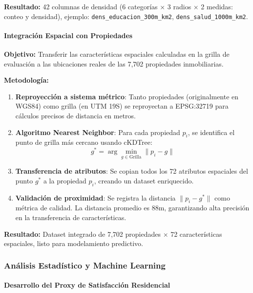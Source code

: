 \textbf{Resultado:} 42 columnas de densidad (6 categorías × 3 radios × 2 medidas: conteo y densidad), ejemplo: \texttt{dens\_educacion\_300m\_km2}, \texttt{dens\_salud\_1000m\_km2}.

\paragraph{Integración Espacial con Propiedades}

\textbf{Objetivo:} Transferir las características espaciales calculadas en la grilla de evaluación a las ubicaciones reales de las 7,702 propiedades inmobiliarias.

\textbf{Metodología:}
\begin{enumerate}
    \item \textbf{Reproyección a sistema métrico}: Tanto propiedades (originalmente en WGS84) como grilla (en UTM 19S) se reproyectan a EPSG:32719 para cálculos precisos de distancia en metros.
    
    \item \textbf{Algoritmo Nearest Neighbor}: Para cada propiedad $p_i$, se identifica el punto de grilla más cercano usando cKDTree:
    \begin{equation}
    g^* = \arg\min_{g \in \text{Grilla}} \|p_i - g\|
    \end{equation}
    
    \item \textbf{Transferencia de atributos}: Se copian todos los 72 atributos espaciales del punto $g^*$ a la propiedad $p_i$, creando un dataset enriquecido.
    
    \item \textbf{Validación de proximidad}: Se registra la distancia $\|p_i - g^*\|$ como métrica de calidad. La distancia promedio es 88m, garantizando alta precisión en la transferencia de características.
\end{enumerate}

\textbf{Resultado:} Dataset integrado de 7,702 propiedades × 72 características espaciales, listo para modelamiento predictivo.

\subsubsection{Análisis Estadístico y Machine Learning}

\paragraph{Desarrollo del Proxy de Satisfacción Residencial}

